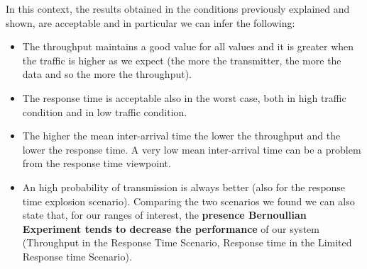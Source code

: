 \noindent In this context, the results obtained in the conditions previously explained and shown, are acceptable and in particular we can infer the following:
\begin{itemize}
	\item The throughput maintains a good value for all values and it is greater when the traffic is higher as we expect (the more the transmitter, the more the data and so the more the throughput).
	\item The response time is acceptable also in the worst case, both in high traffic condition and in low traffic condition. %
	\item The higher the mean inter-arrival time the lower the throughput and the lower the response time. A very low mean inter-arrival time can be a problem from the response time viewpoint.
	\item An high probability of transmission is always better (also for the response time explosion scenario).  Comparing the two scenarios we found we can also state that, for our ranges of interest, the \textbf{presence Bernoullian Experiment tends to decrease the performance} of our system (Throughput in the Response Time Scenario, Response time in the Limited Response time Scenario).
\end{itemize}

